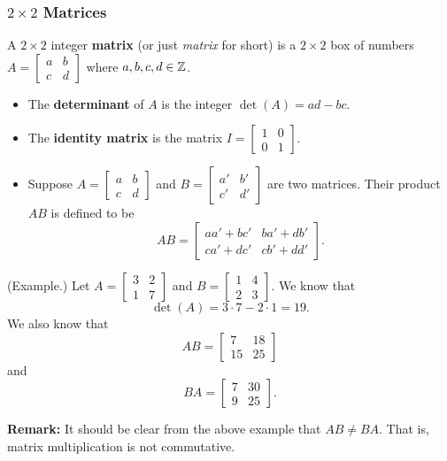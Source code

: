 \documentclass[letterpaper]{article}
\begin{document}
\subsubsection{\texorpdfstring{$2 \times 2$ Matrices}{2 by 2 Matrices}}

\begin{definition}{}{}
    A $2 \times 2$ integer \textbf{matrix} (or just \emph{matrix} for short) is a $2 \times 2$ box of numbers $A = \begin{bmatrix}
        a & b \\ c & d
    \end{bmatrix}$ where $a, b, c, d \in \mathbb{Z}$. 
    \begin{itemize}
        \item The \textbf{determinant} of $A$ is the integer $\det(A) = ad - bc$. 
        \item The \textbf{identity matrix} is the matrix $I = \begin{bmatrix}
            1 & 0 \\ 0 & 1
        \end{bmatrix}$. 
        \item Suppose $A = \begin{bmatrix}
            a & b \\ c & d
        \end{bmatrix}$ and $B = \begin{bmatrix}
            a' & b' \\ c' & d'
        \end{bmatrix}$ are two matrices. Their product $AB$ is defined to be \[AB = \begin{bmatrix}
            aa' + bc' & ba' + db' \\ ca' + dc' & cb' + dd'
        \end{bmatrix}.\]
    \end{itemize}
\end{definition}

\begin{mdframed}
    (Example.) Let $A = \begin{bmatrix}
        3 & 2 \\ 1 & 7
    \end{bmatrix}$ and $B = \begin{bmatrix}
        1 & 4 \\ 2 & 3
    \end{bmatrix}$. We know that \[\det(A) = 3 \cdot 7 - 2 \cdot 1 = 19.\] We also know that \[AB = \begin{bmatrix}
        7 & 18 \\ 15 & 25
    \end{bmatrix}\] and \[BA = \begin{bmatrix}
        7 & 30 \\ 9 & 25
    \end{bmatrix}.\] 
\end{mdframed}
\textbf{Remark:} It should be clear from the above example that $AB \neq BA$. That is, matrix multiplication is not commutative. 
\end{document}
